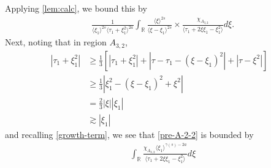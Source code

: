 \documentclass[12pt,reqno]{amsart}
\numberwithin{equation}{section}  %
\numberwithin{figure}{section}
\newcommand{\rr}{\mathbb{R}}
\theoremstyle{plain}
\theoremstyle{definition}
\theoremstyle{remark}
\begin{document}
Applying \autoref{lem:calc}, we bound this by
%
%
\begin{equation}
  \label{pre-A-2-2}
\begin{split}
  &  \frac{1}{\langle \xi_{1} \rangle ^{2s}
  \langle \tau_{1} + \xi_{1}^{2}  \rangle
  ^{2a}} \int_{\rr} \frac{\langle \xi \rangle ^{2s}}{\langle
  \xi - \xi_{1}\rangle ^{2s}}  \times \frac{\chi_{A_{3,2}}}{\langle
  \tau_{1} + 2 \xi \xi_{1} - \xi_{1}^{2} \rangle } d \xi.
\end{split}
\end{equation}
%
Next, noting that in region $A_{3,2}$,
%
%
\begin{equation}
\begin{split}
  | \tau_{1} + \xi_{1}^{2} |
  & \ge \frac{1}{3} \left[ | \tau_{1} + \xi_{1}^{2} | + | \tau - \tau_{1} -
  (\xi - \xi_{1})^{2} | + | \tau - \xi^{2} | \right]
  \\
  & \ge \frac{1}{3} | \xi_{1}^{2} - (\xi - \xi_{1})^{2} + \xi^{2} |
  \\
  & = \frac{2}{3}| \xi | | \xi_{1} |
  \\
  & \gtrsim  | \xi_{1} |
\end{split}
\label{case-2-region-A-2-2-key-est}
\end{equation}
%
%
and recalling \eqref{growth-term}, we see that \eqref{pre-A-2-2} is bounded by
\begin{equation*}
\begin{split}
  &  \int_{\rr} \frac{\chi_{A_{3,2}} \langle \xi_{1} \rangle ^{\gamma(s) -2a}}{\langle
  \tau_{1} + 2 \xi \xi_{1} - \xi_{1}^{2} \rangle } d \xi
\end{split}
\end{equation*}
\end{document}
